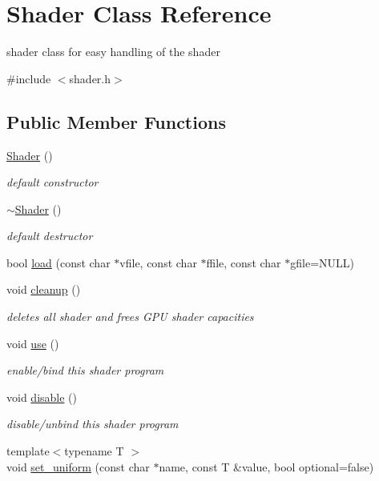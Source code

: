 \hypertarget{classShader}{}\section{Shader Class Reference}
\label{classShader}


shader class for easy handling of the shader  




{\ttfamily \#include $<$shader.\+h$>$}

\subsection*{Public Member Functions}
\begin{DoxyCompactItemize}
\item 
\hyperlink{classShader_a0d654ebaca4e0555197c0724c6d30610}{Shader} ()
\begin{DoxyCompactList}\small\item\em default constructor \end{DoxyCompactList}\item 
\hyperlink{classShader_aff01df87e8a102f270b5b135a295e59d}{$\sim$\+Shader} ()
\begin{DoxyCompactList}\small\item\em default destructor \end{DoxyCompactList}\item 
bool \hyperlink{classShader_abfbc28b370cbf38e58be42cde30ca5b6}{load} (const char $\ast$vfile, const char $\ast$ffile, const char $\ast$gfile=N\+U\+LL)
\item 
void \hyperlink{classShader_a134f0273210077a563ef60e85d7d7e76}{cleanup} ()
\begin{DoxyCompactList}\small\item\em deletes all shader and frees G\+PU shader capacities \end{DoxyCompactList}\item 
void \hyperlink{classShader_a870fa9f13d69e558815d6fd351a469dc}{use} ()
\begin{DoxyCompactList}\small\item\em enable/bind this shader program \end{DoxyCompactList}\item 
void \hyperlink{classShader_ad8368fcacdb176733217c6a15f3ad543}{disable} ()
\begin{DoxyCompactList}\small\item\em disable/unbind this shader program \end{DoxyCompactList}\item 
{\footnotesize template$<$typename T $>$ }\\void \hyperlink{classShader_a01fbc6fc938e196cd89b0f1ad24ef29b}{set\+\_\+uniform} (const char $\ast$name, const T \&value, bool optional=false)
\end{DoxyCompactItemize}
